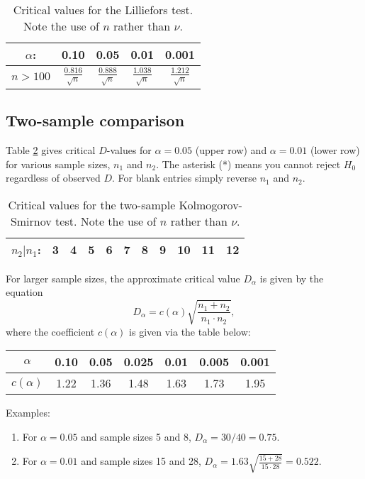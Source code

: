 \begin{table}[h]
\centering
\begin{tabular}{|c|cccc|} \hline
$\alpha$: & \bf{0.10} & \bf{0.05} & \bf{0.01} & \bf{0.001} \\ \hline

$n > 100$	&	$\frac{0.816}{\sqrt{n}}$	&	$\frac{0.888}{\sqrt{n}}$	&	$\frac{1.038}{\sqrt{n}}$	&	$\frac{1.212}{\sqrt{n}}$	\\[4pt] \hline
\end{tabular}
\caption{Critical values for the Lilliefors test.  Note the use of $n$ rather than $\nu$.}
\label{tbl:Critical_KS2}
\end{table}

\clearpage
\subsection{Two-sample comparison}
Table \ref{tbl:Critical_KS3} gives critical $D$-values for $\alpha = 0.05$ (upper row) and $\alpha = 0.01$ (lower row) for various sample sizes, $n_1$ and $n_2$.
The asterisk (*) means you cannot reject $H_0$ regardless of observed $D$.  For blank entries
simply reverse $n_1$ and $n_2$.
\begin{table}[h]
\centering
\begin{tabular}{|c||c|c|c|c|c|c|c|c|c|c|} \hline
$n_2 | n_1$:  &  \bf{3}  & \bf{4} & \bf{5} & \bf{6}  & \bf{7} &  \bf{8}  & \bf{9} & \bf{10} & \bf{11}  & \bf{12} \\ \hline

\end{tabular}
\caption{Critical values for the two-sample Kolmogorov-Smirnov test.  Note the use of $n$ rather than $\nu$.}
\label{tbl:Critical_KS3}
\end{table}

For larger sample sizes, the approximate critical value $D_\alpha$ is given by the equation
\begin{equation}
D_\alpha = c(\alpha) \sqrt{\frac{n_1 + n_2}{n_1\cdot n_2}},
\end{equation}
where the coefficient $c(\alpha)$ is given via the table below:
\begin{table}[H]
\centering
\begin{tabular}{|c||c|c|c|c|c|c|} \hline
$\alpha$	& \bf{0.10} & \bf{0.05} & \bf{0.025} & \bf{0.01} & \bf{0.005} & \bf{0.001} \\ \hline
$c(\alpha)$	& 1.22 & 1.36 & 1.48  & 1.63 & 1.73  & 1.95 \\ \hline
\end{tabular}
\label{tbl:Critical_KS3b}
\end{table}
Examples:
\begin{enumerate}
	\item For $\alpha = 0.05$ and sample sizes 5 and 8, $D_\alpha = 30/40 = 0.75$.
	\item For $\alpha = 0.01$ and sample sizes 15 and 28, $D_\alpha = 1.63 \sqrt{\frac{15+28}{15 \cdot 28}} = 0.522$.
\end{enumerate}

